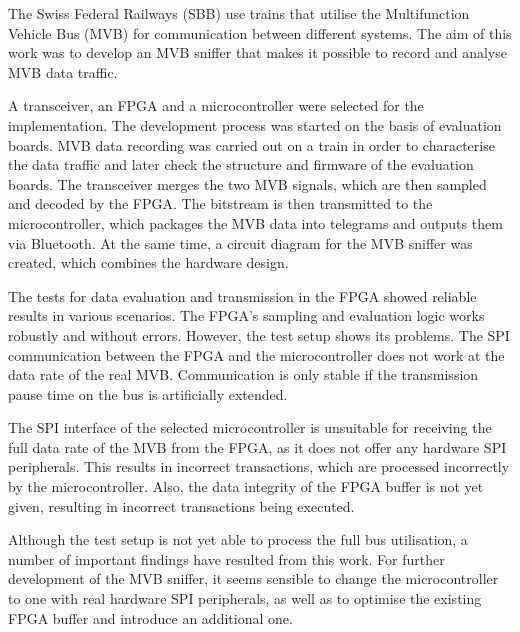 \renewcommand{\extraabstractname}{Abstract} %
\begin{extraAbstract}
The Swiss Federal Railways (SBB) use trains that utilise the Multifunction Vehicle Bus (MVB) for communication between different systems. The aim of this work was to develop an MVB sniffer that makes it possible to record and analyse MVB data traffic.

A transceiver, an FPGA and a microcontroller were selected for the implementation. The development process was started on the basis of evaluation boards. MVB data recording was carried out on a train in order to characterise the data traffic and later check the structure and firmware of the evaluation boards. The transceiver merges the two MVB signals, which are then sampled and decoded by the FPGA. The bitstream is then transmitted to the microcontroller, which packages the MVB data into telegrams and outputs them via Bluetooth. At the same time, a circuit diagram for the MVB sniffer was created, which combines the hardware design.

The tests for data evaluation and transmission in the FPGA showed reliable results in various scenarios. The FPGA's sampling and evaluation logic works robustly and without errors. However, the test setup shows its problems. The SPI communication between the FPGA and the microcontroller does not work at the data rate of the real MVB. Communication is only stable if the transmission pause time on the bus is artificially extended.

The SPI interface of the selected microcontroller is unsuitable for receiving the full data rate of the MVB from the FPGA, as it does not offer any hardware SPI peripherals. This results in incorrect transactions, which are processed incorrectly by the microcontroller. Also, the data integrity of the FPGA buffer is not yet given, resulting in incorrect transactions being executed.

Although the test setup is not yet able to process the full bus utilisation, a number of important findings have resulted from this work. For further development of the MVB sniffer, it seems sensible to change the microcontroller to one with real hardware SPI peripherals, as well as to optimise the existing FPGA buffer and introduce an additional one.

\end{extraAbstract}



